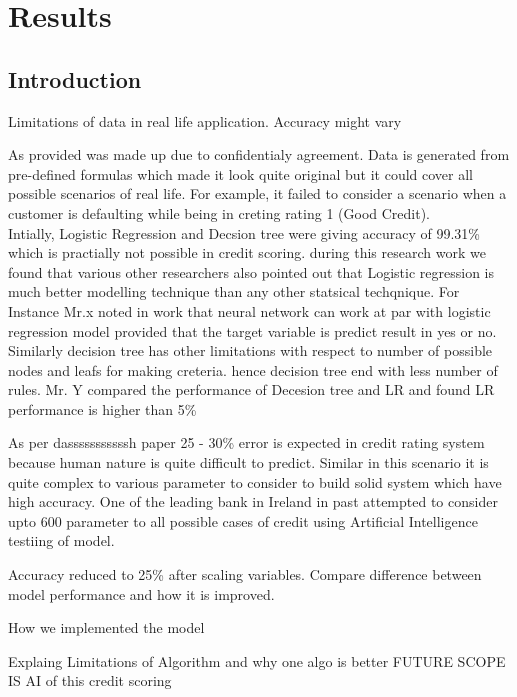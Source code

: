 %
%
%
%

\chapter{Results}\label{C.Results}

\section{Introduction}\label{S.intro5}

Limitations of data in real life application. Accuracy might vary

As provided was made up due to confidentialy agreement. Data is generated from pre-defined formulas which made it look quite original but it could cover all possible scenarios of real life. For example, it failed to consider a scenario when a customer is defaulting while being in creting rating 1 (Good Credit). \\

Intially, Logistic Regression and Decsion tree were giving accuracy of 99.31\% which is practially not possible in credit scoring. during this research work we found that various other researchers also pointed out that Logistic regression is much better modelling technique than any other statsical techqnique. For Instance Mr.x noted in work that neural network can work at par with logistic regression model provided that the target variable is predict result in yes or no.\\

Similarly decision tree has other limitations with respect to number of possible nodes and leafs for making creteria. hence decision tree end with less number of rules. Mr. Y compared the performance of Decesion tree and LR and found LR performance is higher than 5\%

As per dasssssssssssh paper 25 - 30\% error is expected in credit rating system because human nature is quite difficult to predict. Similar in this scenario it is quite complex to various parameter to consider to build solid system which have high accuracy. One of the leading bank in Ireland in past attempted to consider upto 600 parameter to all possible cases of credit using Artificial Intelligence 
testiing of model.

Accuracy reduced to 25\% after scaling variables. Compare difference between model performance and how it is improved.

How we implemented the model

Explaing Limitations of Algorithm and why one algo is better
FUTURE SCOPE IS AI of this credit scoring


